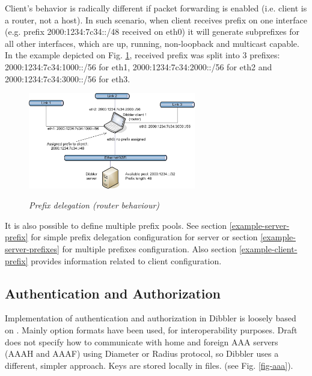 Client's behavior is radically different if packet forwarding is
enabled (i.e. client is a router, not a host). In such scenario, when
client receives prefix on one interface (e.g. prefix
2000:1234:7c34::/48 received on eth0) it will generate subprefixes for
all other interfaces, which are up, running, non-loopback and
multicast capable. In the example depicted on
Fig. \ref{fig-prefixes-router}, received prefix was split into 3
prefixes: 2000:1234:7c34:1000::/56 for eth1, 2000:1234:7c34:2000::/56 for eth2
and 2000:1234:7c34:3000::/56 for eth3.

\begin{figure}[ht]
\begin{center}
\label{fig-prefixes-router}
\includegraphics[width=0.65\textwidth]{dibbler-prefixes-router}
\caption{\emph{Prefix delegation (router behaviour)}}
\end{center}
\end{figure}

It is also possible to define multiple prefix pools. See section
\ref{example-server-prefix} for simple prefix delegation configuration
for server or section \ref{example-server-prefixes} for multiple
prefixes configuration. Also section \ref{example-client-prefix}
provides information related to client configuration.

\subsection{Authentication and Authorization}
\label{features-auth}

Implementation of authentication and authorization in Dibbler is
loosely based on \cite{draft-aaa}. Mainly option formats have been
used, for interoperability purposes. Draft does not specify how to
communicate with home and foreign AAA servers (AAAH and AAAF) using
Diameter or Radius protocol, so Dibbler uses a different, simpler
approach. Keys are stored locally in files. (see Fig. \ref{fig-aaa}).

